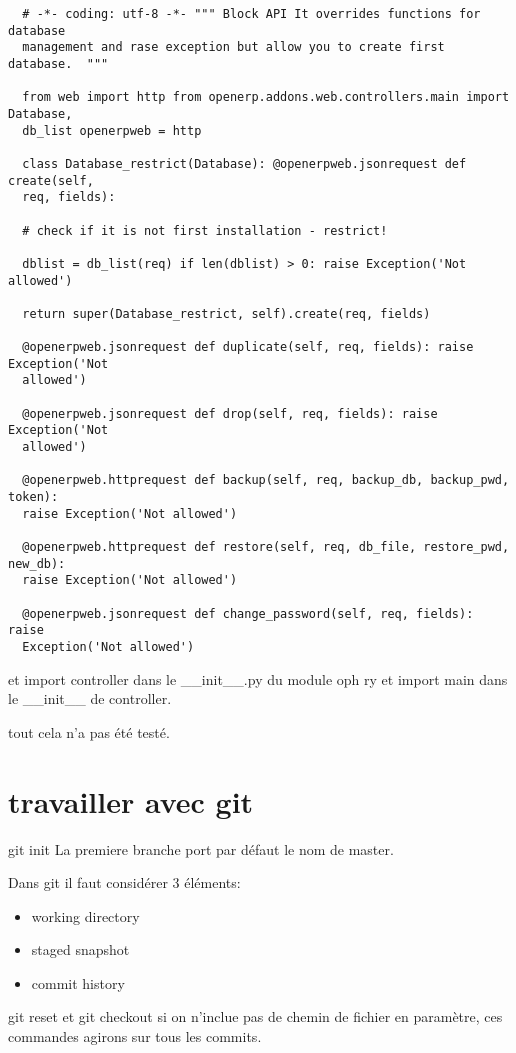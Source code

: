 \documentclass[12pt,a4paper]{article}
\begin{document}
\begin{verbatim}
  # -*- coding: utf-8 -*- """ Block API It overrides functions for database
  management and rase exception but allow you to create first database.  """

  from web import http from openerp.addons.web.controllers.main import Database,
  db_list openerpweb = http

  class Database_restrict(Database): @openerpweb.jsonrequest def create(self,
  req, fields):

  # check if it is not first installation - restrict!

  dblist = db_list(req) if len(dblist) > 0: raise Exception('Not allowed')

  return super(Database_restrict, self).create(req, fields)

  @openerpweb.jsonrequest def duplicate(self, req, fields): raise Exception('Not
  allowed')

  @openerpweb.jsonrequest def drop(self, req, fields): raise Exception('Not
  allowed')

  @openerpweb.httprequest def backup(self, req, backup_db, backup_pwd, token):
  raise Exception('Not allowed')

  @openerpweb.httprequest def restore(self, req, db_file, restore_pwd, new_db):
  raise Exception('Not allowed')

  @openerpweb.jsonrequest def change_password(self, req, fields): raise
  Exception('Not allowed')
\end{verbatim}

et import controller dans le __init__.py du module oph ry 
et import main dans le __init__ de controller.

tout cela n'a pas été testé.

\section{travailler avec git}

git init
La premiere branche port par défaut le nom de master.



Dans git il faut considérer 3 éléments:
\begin{itemize}
\item working directory
\item staged snapshot
\item commit history
\end{itemize}

git reset et git checkout si on n'inclue pas de chemin de fichier en paramètre, ces commandes agirons sur tous les commits.
\end{document}
